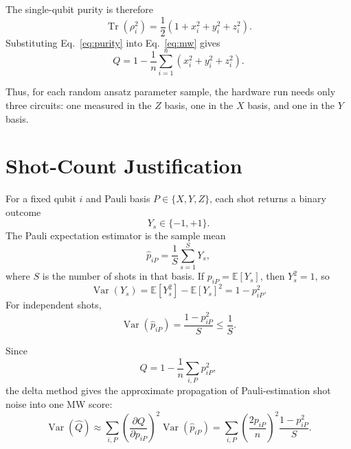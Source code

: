 \documentclass[11pt]{article}
\begin{document}
The single-qubit purity is therefore
\begin{equation}
\operatorname{Tr}(\rho_i^2)
=
\frac{1}{2}
\left(1+x_i^2+y_i^2+z_i^2\right).
\label{eq:purity}
\end{equation}
Substituting Eq.~\eqref{eq:purity} into Eq.~\eqref{eq:mw} gives
\begin{equation}
Q
=
1-\frac{1}{n}
\sum_{i=1}^{n}
\left(x_i^2+y_i^2+z_i^2\right).
\label{eq:mw_bloch}
\end{equation}

Thus, for each random ansatz parameter sample, the hardware run needs only
three circuits: one measured in the \(Z\) basis, one in the \(X\) basis, and one
in the \(Y\) basis.

\section{Shot-Count Justification}

For a fixed qubit \(i\) and Pauli basis \(P \in \{X,Y,Z\}\), each shot returns
a binary outcome
\begin{equation}
Y_s \in \{-1,+1\}.
\end{equation}
The Pauli expectation estimator is the sample mean
\begin{equation}
\hat p_{iP}
=
\frac{1}{S}
\sum_{s=1}^{S} Y_s,
\end{equation}
where \(S\) is the number of shots in that basis. If
\(p_{iP}=\mathbb{E}[Y_s]\), then \(Y_s^2=1\), so
\begin{equation}
\operatorname{Var}(Y_s)
=
\mathbb{E}[Y_s^2]-\mathbb{E}[Y_s]^2
=
1-p_{iP}^2.
\end{equation}
For independent shots,
\begin{equation}
\operatorname{Var}(\hat p_{iP})
=
\frac{1-p_{iP}^2}{S}
\leq
\frac{1}{S}.
\label{eq:pauli_var}
\end{equation}

Since
\begin{equation}
Q
=
1-\frac{1}{n}\sum_{i,P}p_{iP}^2,
\end{equation}
the delta method gives the approximate propagation of Pauli-estimation shot
noise into one MW score:
\begin{equation}
\operatorname{Var}(\hat Q)
\approx
\sum_{i,P}
\left(
\frac{\partial Q}{\partial p_{iP}}
\right)^2
\operatorname{Var}(\hat p_{iP})
=
\sum_{i,P}
\left(
\frac{2p_{iP}}{n}
\right)^2
\frac{1-p_{iP}^2}{S}.
\label{eq:delta}
\end{equation}
\end{document}
